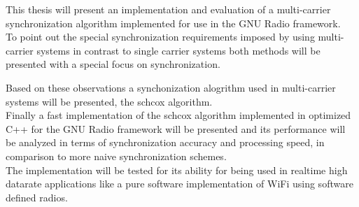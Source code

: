 This thesis will present an implementation and evaluation of a
multi-carrier synchronization algorithm implemented for use
in the GNU Radio framework. \\

To point out the special synchronization requirements
imposed by using multi-carrier systems in contrast
to single carrier systems both methods will be presented
with a special focus on synchronization.

Based on these observations a synchonization alogrithm
used in multi-carrier systems will be presented,
the \gls{schcox} algorithm. \\

Finally a fast implementation of the \gls{schcox} algorithm
implemented in optimized C++ for the GNU Radio framework
will be presented and its performance will be analyzed
in terms of synchronization accuracy and processing speed,
in comparison to more naive synchronization schemes. \\

The implementation will be tested for its ability
for being used in realtime high datarate applications
like a pure software implementation of WiFi using
software defined radios.
